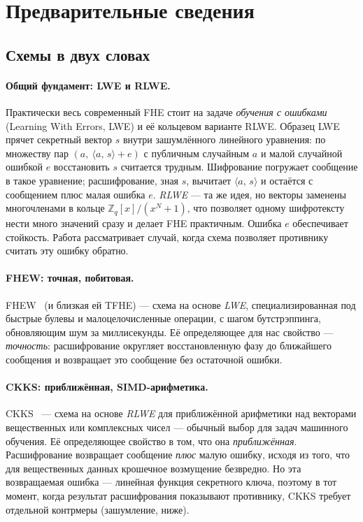 \documentclass[11pt]{article}
\newcommand{\inner}[2]{\langle #1,\, #2\rangle}
\newcommand{\Z}{\mathbb{Z}}
\begin{document}
\section{Предварительные сведения}

\subsection{Схемы в двух словах}
\label{sec:glance}

\paragraph{Общий фундамент: LWE и RLWE.}
Практически весь современный FHE стоит на задаче \emph{обучения с ошибками} (Learning With Errors,
LWE) и её кольцевом варианте RLWE. Образец LWE прячет секретный вектор $s$ внутри зашумлённого
линейного уравнения: по множеству пар $(a,\ \inner{a}{s} + e)$ с публичным случайным $a$ и малой
случайной ошибкой $e$ восстановить $s$ считается трудным. Шифрование погружает сообщение в такое
уравнение; расшифрование, зная $s$, вычитает $\inner{a}{s}$ и остаётся с сообщением плюс малая
ошибка $e$. \emph{RLWE} --- та же идея, но векторы заменены многочленами в кольце
$\Z_q[x]/(x^N+1)$, что позволяет одному шифротексту нести много значений сразу и делает FHE
практичным. Ошибка $e$ обеспечивает стойкость. Работа рассматривает случай, когда схема позволяет
противнику считать эту ошибку обратно.

\paragraph{FHEW: точная, побитовая.}
FHEW~\cite{ducas2015} (и близкая ей TFHE) --- схема на основе \emph{LWE}, специализированная под
быстрые булевы и малоцелочисленные операции, с шагом бутстрэппинга, обновляющим шум за миллисекунды.
Её определяющее для нас свойство --- \emph{точность}: расшифрование округляет восстановленную фазу до
ближайшего сообщения и возвращает это сообщение без остаточной ошибки.

\paragraph{CKKS: приближённая, SIMD-арифметика.}
CKKS~\cite{cheon2017} --- схема на основе \emph{RLWE} для приближённой арифметики над векторами
вещественных или комплексных чисел --- обычный выбор для задач машинного обучения. Её
определяющее свойство в том, что она \emph{приближённая}. Расшифрование возвращает сообщение
\emph{плюс} малую ошибку, исходя из того, что для вещественных
данных крошечное возмущение безвредно. Но эта возвращаемая ошибка --- линейная функция секретного
ключа, поэтому в тот момент, когда результат расшифрования показывают противнику, CKKS требует
отдельной контрмеры (зашумление, ниже).
\end{document}
